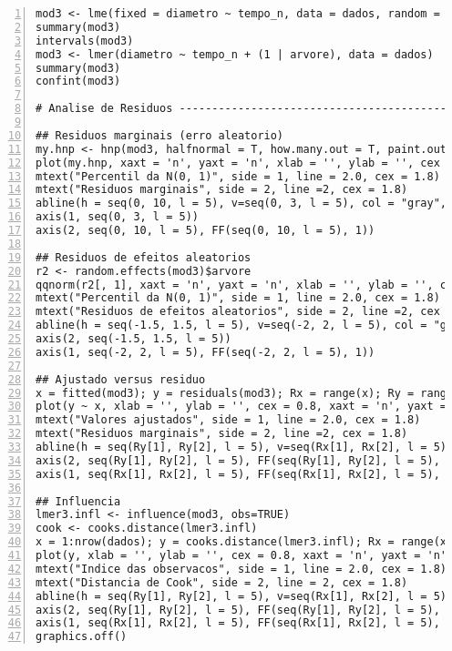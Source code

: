 \documentclass[12pt,a4paper,final]{article}
\begin{document}
\begin{lstlisting}[breaklines = true, frame = tblr, language = SAS, numbers=left, numberstyle=\tiny]
mod3 <- lme(fixed = diametro ~ tempo_n, data = dados, random = ~ 1 | arvore)
summary(mod3)
intervals(mod3)
mod3 <- lmer(diametro ~ tempo_n + (1 | arvore), data = dados)
summary(mod3)
confint(mod3)

# Analise de Residuos -------------------------------------------------------

## Residuos marginais (erro aleatorio)
my.hnp <- hnp(mod3, halfnormal = T, how.many.out = T, paint.out = T, plot = T)
plot(my.hnp, xaxt = 'n', yaxt = 'n', xlab = '', ylab = '', cex = 0.6, ylim = c(0, 10))
mtext("Percentil da N(0, 1)", side = 1, line = 2.0, cex = 1.8)
mtext("Residuos marginais", side = 2, line =2, cex = 1.8)
abline(h = seq(0, 10, l = 5), v=seq(0, 3, l = 5), col = "gray", lty = "dotted")
axis(1, seq(0, 3, l = 5))
axis(2, seq(0, 10, l = 5), FF(seq(0, 10, l = 5), 1))

## Residuos de efeitos aleatorios
r2 <- random.effects(mod3)$arvore
qqnorm(r2[, 1], xaxt = 'n', yaxt = 'n', xlab = '', ylab = '', cex = 0.6, main = ""); qqline(r2[, 1])
mtext("Percentil da N(0, 1)", side = 1, line = 2.0, cex = 1.8)
mtext("Residuos de efeitos aleatorios", side = 2, line =2, cex = 1.8)
abline(h = seq(-1.5, 1.5, l = 5), v=seq(-2, 2, l = 5), col = "gray", lty = "dotted")
axis(2, seq(-1.5, 1.5, l = 5))
axis(1, seq(-2, 2, l = 5), FF(seq(-2, 2, l = 5), 1))

## Ajustado versus residuo
x = fitted(mod3); y = residuals(mod3); Rx = range(x); Ry = range(y)
plot(y ~ x, xlab = '', ylab = '', cex = 0.8, xaxt = 'n', yaxt = 'n')
mtext("Valores ajustados", side = 1, line = 2.0, cex = 1.8)
mtext("Residuos marginais", side = 2, line =2, cex = 1.8)
abline(h = seq(Ry[1], Ry[2], l = 5), v=seq(Rx[1], Rx[2], l = 5), col = "gray", lty = "dotted")
axis(2, seq(Ry[1], Ry[2], l = 5), FF(seq(Ry[1], Ry[2], l = 5), 1))
axis(1, seq(Rx[1], Rx[2], l = 5), FF(seq(Rx[1], Rx[2], l = 5), 1))

## Influencia
lmer3.infl <- influence(mod3, obs=TRUE)
cook <- cooks.distance(lmer3.infl)
x = 1:nrow(dados); y = cooks.distance(lmer3.infl); Rx = range(x); Ry = range(y)
plot(y, xlab = '', ylab = '', cex = 0.8, xaxt = 'n', yaxt = 'n')
mtext("Indice das observacos", side = 1, line = 2.0, cex = 1.8)
mtext("Distancia de Cook", side = 2, line = 2, cex = 1.8)
abline(h = seq(Ry[1], Ry[2], l = 5), v=seq(Rx[1], Rx[2], l = 5), col = "gray", lty = "dotted")
axis(2, seq(Ry[1], Ry[2], l = 5), FF(seq(Ry[1], Ry[2], l = 5), 3))
axis(1, seq(Rx[1], Rx[2], l = 5), FF(seq(Rx[1], Rx[2], l = 5), 0))
graphics.off()

\end{lstlisting}
\end{document}
